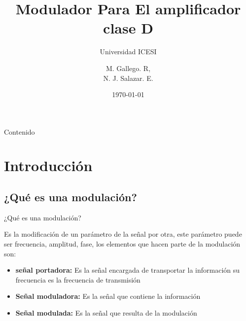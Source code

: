 \documentclass{if-beamer}
\title[Modulador]{Modulador Para El amplificador clase D}
\subtitle{Universidad ICESI}
\author{M. Gallego. R, \\
N. J. Salazar. E.}
\institute[ICESI]{
}
\date{\today}
\begin{document}
\begin{frame}
  \titlepage
\end{frame}

\begin{frame}{Contenido}
  \tableofcontents
\end{frame}

\section{Introducción}
\subsection{¿Qué es una modulación?}
\begin{frame}{¿Qué es una modulación?}

Es la modificación de un parámetro de la señal por otra, este 
parámetro puede ser frecuencia, amplitud, fase, los elementos que hacen parte de la modulación son: 

\begin{itemize}
    \item \textbf{señal portadora: } Es la señal encargada de transportar la información su frecuencia es la frecuencia de transmisión 
    \item \textbf{Señal moduladora: } Es la señal que contiene la información 
    \item \textbf{Señal modulada: } Es la señal que resulta de la modulación 
\end{itemize}{}
\end{frame}{}
\end{document}
